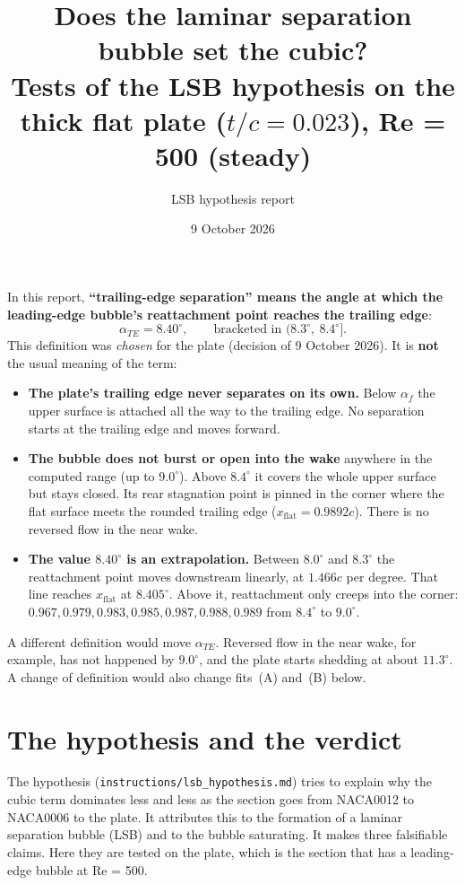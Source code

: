 \documentclass[11pt,a4paper]{article}
\title{Does the laminar separation bubble set the cubic?\\[2pt]
\large Tests of the LSB hypothesis on the thick flat plate ($t/c = 0.023$), Re = 500 (steady)}
\author{LSB hypothesis report}
\date{9 October 2026}
\newcommand{\af}{\alpha_f}
\newcommand{\ate}{\alpha_{TE}}
\begin{document}
\maketitle

\begin{definitionbox}
In this report, \textbf{``trailing-edge separation'' means the angle at which the
leading-edge bubble's reattachment point reaches the trailing edge}:
\[
  \ate = 8.40^\circ, \qquad \text{bracketed in } (8.3^\circ,\ 8.4^\circ].
\]
This definition was \emph{chosen} for the plate (decision of 9 October 2026). It is
\textbf{not} the usual meaning of the term:
\begin{itemize}[leftmargin=*]
\item \textbf{The plate's trailing edge never separates on its own.} Below $\af$ the upper
  surface is attached all the way to the trailing edge. No separation starts at the trailing
  edge and moves forward.
\item \textbf{The bubble does not burst or open into the wake} anywhere in the computed range
  (up to $9.0^\circ$). Above $8.4^\circ$ it covers the whole upper surface but stays closed. Its
  rear stagnation point is pinned in the corner where the flat surface meets the rounded trailing
  edge ($x_{\text{flat}} = 0.9892c$). There is no reversed flow in the near wake.
\item \textbf{The value $8.40^\circ$ is an extrapolation.} Between $8.0^\circ$ and $8.3^\circ$ the
  reattachment point moves downstream linearly, at $1.466c$ per degree. That line reaches
  $x_{\text{flat}}$ at $8.405^\circ$. Above it, reattachment only creeps into the corner:
  $0.967, 0.979, 0.983, 0.985, 0.987, 0.988, 0.989$ from $8.4^\circ$ to $9.0^\circ$.
\end{itemize}
A different definition would move $\ate$. Reversed flow in the near wake, for example, has not
happened by $9.0^\circ$, and the plate starts shedding at about $11.3^\circ$. A change of
definition would also change fits~(A) and~(B) below.
\end{definitionbox}

\section{The hypothesis and the verdict}

The hypothesis (\texttt{instructions/lsb\_hypothesis.md}) tries to explain why the cubic term
dominates less and less as the section goes from NACA0012 to NACA0006 to the plate. It attributes
this to the formation of a laminar separation bubble (LSB) and to the bubble saturating. It makes
three falsifiable claims. Here they are tested on the plate, which is the section that has a
leading-edge bubble at Re = 500.
\end{document}
